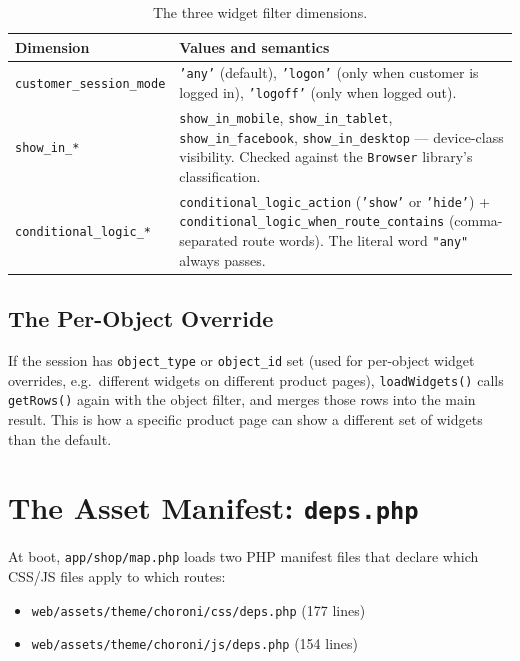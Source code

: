 \documentclass[11pt,a4paper]{article}
\begin{document}
\begin{table}[htbp]
\centering
\caption{The three widget filter dimensions.}\label{tab:widget-filters}
\small
\begin{tabularx}{\columnwidth}{lX}
\toprule
\textbf{Dimension} & \textbf{Values and semantics} \\
\midrule
\texttt{customer\_session\_mode} & \texttt{'any'} (default), \texttt{'logon'} (only when customer is logged in), \texttt{'logoff'} (only when logged out). \\
\texttt{show\_in\_*} & \texttt{show\_in\_mobile}, \texttt{show\_in\_tablet}, \texttt{show\_in\_facebook}, \texttt{show\_in\_desktop} --- device-class visibility. Checked against the \texttt{Browser} library's classification. \\
\texttt{conditional\_logic\_*} & \texttt{conditional\_logic\_action} (\texttt{'show'} or \texttt{'hide'}) + \texttt{conditional\_logic\_when\_route\_contains} (comma-separated route words). The literal word \texttt{"any"} always passes. \\
\bottomrule
\end{tabularx}
\end{table}

\subsection{The Per-Object Override}

If the session has \texttt{object\_type} or \texttt{object\_id}
set (used for per-object widget overrides, e.g.\ different widgets
on different product pages), \texttt{loadWidgets()} calls
\texttt{getRows()} again with the object filter, and merges those
rows into the main result. This is how a specific product page can
show a different set of widgets than the default.

\section{The Asset Manifest: \texttt{deps.php}}\label{sec:assets}

At boot, \texttt{app/shop/map.php} loads two PHP manifest files
that declare which CSS/JS files apply to which routes:

\begin{itemize}[leftmargin=1.6em,itemsep=2pt]
  \item \texttt{web/assets/theme/choroni/css/deps.php} (177 lines)
  \item \texttt{web/assets/theme/choroni/js/deps.php} (154 lines)
\end{itemize}
\end{document}
